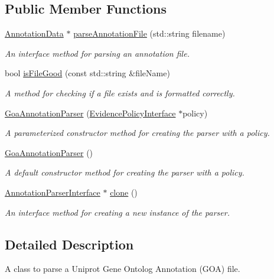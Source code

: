 \subsection*{Public Member Functions}
\begin{DoxyCompactItemize}
\item 
\hyperlink{classAnnotationData}{Annotation\+Data} $\ast$ \hyperlink{classGoaAnnotationParser_a2973e2dcfecea10e09da13ed0ab27dff}{parse\+Annotation\+File} (std\+::string filename)
\begin{DoxyCompactList}\small\item\em An interface method for parsing an annotation file. \end{DoxyCompactList}\item 
bool \hyperlink{classGoaAnnotationParser_aa8093812131c34de52b084ff2b02abbf}{is\+File\+Good} (const std\+::string \&file\+Name)
\begin{DoxyCompactList}\small\item\em A method for checking if a file exists and is formatted correctly. \end{DoxyCompactList}\item 
\hyperlink{classGoaAnnotationParser_a3f415dfbfd2bce5143eef60532ebadea}{Goa\+Annotation\+Parser} (\hyperlink{classEvidencePolicyInterface}{Evidence\+Policy\+Interface} $\ast$policy)
\begin{DoxyCompactList}\small\item\em A parameterized constructor method for creating the parser with a policy. \end{DoxyCompactList}\item 
\hyperlink{classGoaAnnotationParser_aa06b6ba409d97fe794ae1a7606864e65}{Goa\+Annotation\+Parser} ()
\begin{DoxyCompactList}\small\item\em A default constructor method for creating the parser with a policy. \end{DoxyCompactList}\item 
\hyperlink{classAnnotationParserInterface}{Annotation\+Parser\+Interface} $\ast$ \hyperlink{classGoaAnnotationParser_a266297bb5a107572c98515f692684369}{clone} ()
\begin{DoxyCompactList}\small\item\em An interface method for creating a new instance of the parser. \end{DoxyCompactList}\end{DoxyCompactItemize}


\subsection{Detailed Description}
A class to parse a Uniprot Gene Ontolog Annotation (G\+OA) file. 


